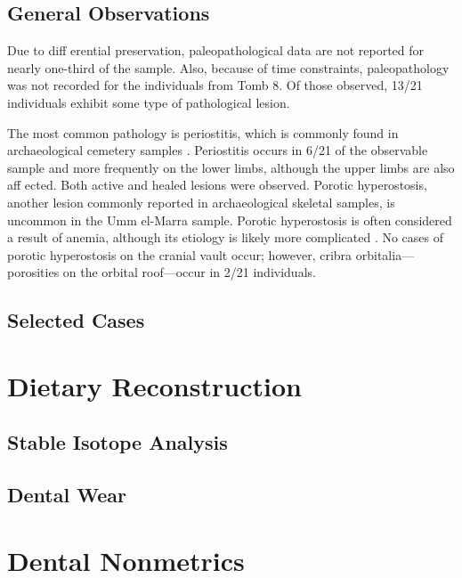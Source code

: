 \documentclass[]{book}
\begin{document}
\subsection{General Observations}\label{general-observations}

Due to diff erential preservation, paleopathological data are not
reported for nearly one-third of the sample. Also, because of time
constraints, paleopathology was not recorded for the individuals from
Tomb 8. Of those observed, 13/21 individuals exhibit some type of
pathological lesion.

The most common pathology is periostitis, which is commonly found in
archaeological cemetery samples \citep{ortner2003identification}.
Periostitis occurs in 6/21 of the observable sample and more frequently
on the lower limbs, although the upper limbs are also aff ected. Both
active and healed lesions were observed. Porotic hyperostosis, another
lesion commonly reported in archaeological skeletal samples, is uncommon
in the Umm el-Marra sample. Porotic hyperostosis is often considered a
result of anemia, although its etiology is likely more complicated
\citep{walker2009causes}. No cases of porotic hyperostosis on the
cranial vault occur; however, cribra orbitalia---porosities on the
orbital roof---occur in 2/21 individuals.

\subsection{Selected Cases}\label{selected-cases}

\section{Dietary Reconstruction}\label{dietary-reconstruction}

\subsection{Stable Isotope Analysis}\label{stable-isotope-analysis}

\subsection{Dental Wear}\label{dental-wear}

\section{Dental Nonmetrics}\label{dental-nonmetrics}
\end{document}
